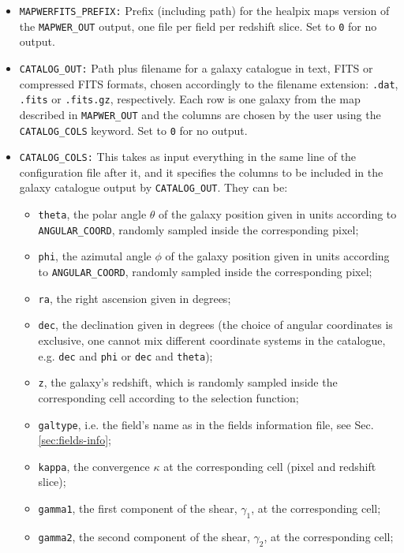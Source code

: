 \documentclass[12pt]{book} %
\begin{document}
\begin{itemize}
\item {\tt MAPWERFITS\_PREFIX:} Prefix (including path) for the {\sc healpix} maps version 
  of the {\tt MAPWER\_OUT} output, one file per field per redshift slice. Set to {\tt 0} for no output. 

\item {\tt CATALOG\_OUT:} Path plus filename for a galaxy catalogue in text, FITS or compressed
  FITS formats, chosen accordingly to the filename extension: {\tt .dat}, {\tt .fits} or {\tt .fits.gz}, 
  respectively. Each row is one galaxy from the map described in {\tt MAPWER\_OUT} and 
  the columns are chosen by the user using the {\tt CATALOG\_COLS} keyword. Set to {\tt 0} for no output.

\item {\tt CATALOG\_COLS:} This takes as input everything in the same line of the configuration 
  file after it, and it specifies the columns to be included in the galaxy catalogue output by 
  {\tt CATALOG\_OUT}. They can be: 
  \begin{itemize}
  \item {\tt theta}, the polar angle $\theta$ of the galaxy position given in units according to 
    {\tt ANGULAR\_COORD}, randomly sampled inside the corresponding pixel; 
  \item {\tt phi}, the azimutal angle $\phi$ of the galaxy position given in units according to 
    {\tt ANGULAR\_COORD}, randomly sampled inside the corresponding pixel;
  \item {\tt ra}, the right ascension given in degrees;
  \item {\tt dec}, the declination given in degrees (the choice of angular coordinates is exclusive, 
    one cannot mix different coordinate systems in the catalogue, e.g. {\tt dec} and {\tt phi} or 
    {\tt dec} and {\tt theta});
  \item {\tt z}, the galaxy's redshift, which is randomly sampled inside the corresponding cell 
    according to the selection function; 
  \item {\tt galtype}, i.e. the field's name as in the fields information file, see Sec. \ref{sec:fields-info}; 
  \item {\tt kappa}, the convergence $\kappa$ at the corresponding cell (pixel and redshift slice);
  \item {\tt gamma1}, the first component of the shear, $\gamma_1$, at the corresponding cell;
  \item {\tt gamma2}, the second component of the shear, $\gamma_2$, at the corresponding cell; 

\end{itemize}
\end{itemize}
\end{document}
